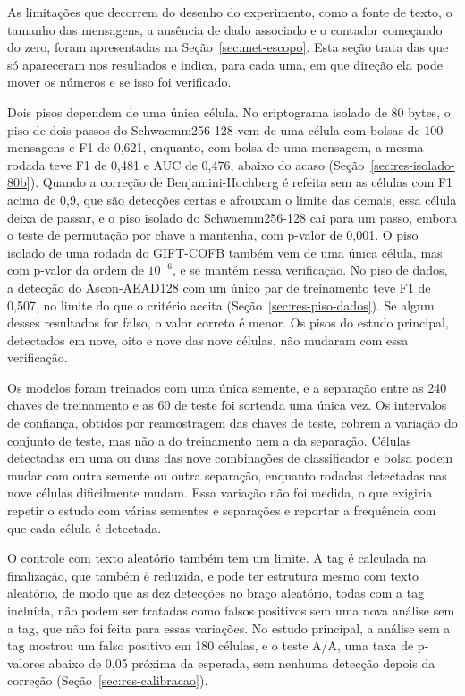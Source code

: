 As limitações que decorrem do desenho do experimento, como a fonte de texto, o tamanho das mensagens, a ausência de dado associado e o contador começando do zero, foram apresentadas na Seção~\ref{sec:met-escopo}. Esta seção trata das que só apareceram nos resultados e indica, para cada uma, em que direção ela pode mover os números e se isso foi verificado.

Dois pisos dependem de uma única célula. No criptograma isolado de 80 bytes, o piso de dois passos do Schwaemm256-128 vem de uma célula com bolsas de 100 mensagens e F1 de 0,621, enquanto, com bolsa de uma mensagem, a mesma rodada teve F1 de 0,481 e AUC de 0,476, abaixo do acaso (Seção~\ref{sec:res-isolado-80b}). Quando a correção de Benjamini-Hochberg é refeita sem as células com F1 acima de 0,9, que são detecções certas e afrouxam o limite das demais, essa célula deixa de passar, e o piso isolado do Schwaemm256-128 cai para um passo, embora o teste de permutação por chave a mantenha, com p-valor de 0,001. O piso isolado de uma rodada do GIFT-COFB também vem de uma única célula, mas com p-valor da ordem de $10^{-6}$, e se mantém nessa verificação. No piso de dados, a detecção do Ascon-AEAD128 com um único par de treinamento teve F1 de 0,507, no limite do que o critério aceita (Seção~\ref{sec:res-piso-dados}). Se algum desses resultados for falso, o valor correto é menor. Os pisos do estudo principal, detectados em nove, oito e nove das nove células, não mudaram com essa verificação.

Os modelos foram treinados com uma única semente, e a separação entre as 240 chaves de treinamento e as 60 de teste foi sorteada uma única vez. Os intervalos de confiança, obtidos por reamostragem das chaves de teste, cobrem a variação do conjunto de teste, mas não a do treinamento nem a da separação. Células detectadas em uma ou duas das nove combinações de classificador e bolsa podem mudar com outra semente ou outra separação, enquanto rodadas detectadas nas nove células dificilmente mudam. Essa variação não foi medida, o que exigiria repetir o estudo com várias sementes e separações e reportar a frequência com que cada célula é detectada.

O controle com texto aleatório também tem um limite. A tag é calculada na finalização, que também é reduzida, e pode ter estrutura mesmo com texto aleatório, de modo que as dez detecções no braço aleatório, todas com a tag incluída, não podem ser tratadas como falsos positivos sem uma nova análise sem a tag, que não foi feita para essas variações. No estudo principal, a análise sem a tag mostrou um falso positivo em 180 células, e o teste A/A, uma taxa de p-valores abaixo de 0,05 próxima da esperada, sem nenhuma detecção depois da correção (Seção~\ref{sec:res-calibracao}).

